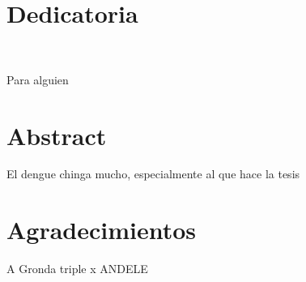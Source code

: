 \documentclass[12pt]{report}
\begin{document}
{}


\chapter*{Dedicatoria}\

Para alguien


\chapter*{Abstract}

El dengue chinga mucho, especialmente al que hace la tesis


\chapter*{Agradecimientos}

A Gronda triple x ANDELE


\tableofcontents{}

\listoftables{}

\listoffigures{}



\thispagestyle{noheaderfooter}
















\appendix


\end{document}
